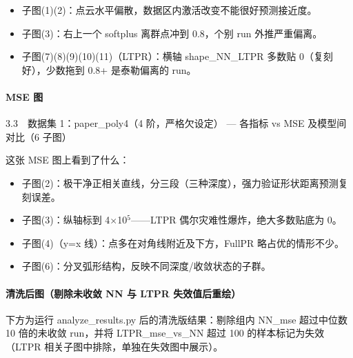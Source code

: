 \documentclass[UTF8,a4paper,11pt]{ctexart}
\begin{document}
\begin{itemize}
\item 子图(1)(2)：点云水平偏散，数据区内激活改变不能很好预测接近度。
\end{itemize}

\begin{itemize}
\item 子图(3)：右上一个 softplus 离群点冲到 0.8，个别 run 外推严重偏离。
\end{itemize}

\begin{itemize}
\item 子图(7)(8)(9)(10)(11)（LTPR）：横轴 shape\_NN\_LTPR 多数贴 0（复刻好），少数拖到 0.8+ 是泰勒偏离的 run。
\end{itemize}

\paragraph{MSE 图}

3.3　数据集 1：paper\_poly4（4 阶，严格欠设定） --- 各指标 vs MSE 及模型间对比（6 子图）

这张 MSE 图上看到了什么：

\begin{itemize}
\item 子图(2)：极干净正相关直线，分三段（三种深度），强力验证形状距离预测复刻误差。
\end{itemize}

\begin{itemize}
\item 子图(3)：纵轴标到 4$\times$10$^5$------LTPR 偶尔灾难性爆炸，绝大多数贴底为 0。
\end{itemize}

\begin{itemize}
\item 子图(4)（y=x 线）：点多在对角线附近及下方，FullPR 略占优的情形不少。
\end{itemize}

\begin{itemize}
\item 子图(6)：分叉弧形结构，反映不同深度/收敛状态的子群。
\end{itemize}

\paragraph{清洗后图（剔除未收敛 NN 与 LTPR 失效值后重绘）}

下方为运行 analyze\_results.py 后的清洗版结果：剔除组内 NN\_mse 超过中位数 10 倍的未收敛 run，并将 LTPR\_mse\_vs\_NN 超过 100 的样本标记为失效（LTPR 相关子图中排除，单独在失效图中展示）。
\end{document}
